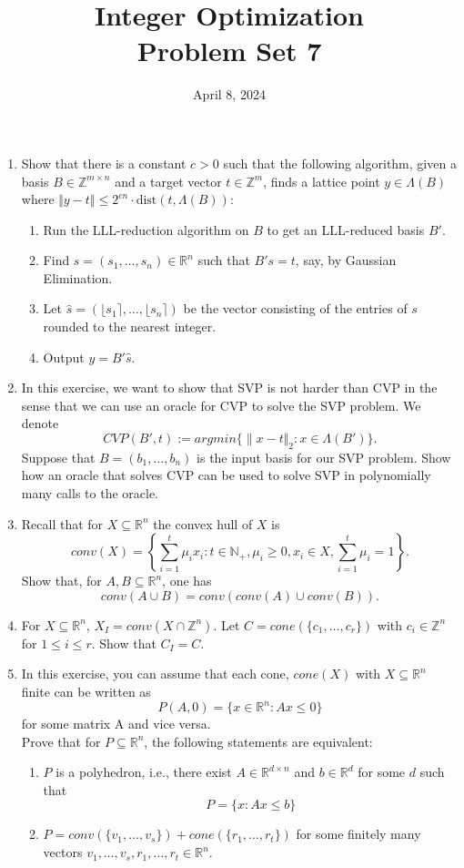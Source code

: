 \documentclass[11pt,a4paper]{article}
\title{Integer Optimization  \\ Problem Set 7 }
\date{ April 8, 2024}
\renewcommand{\leq}{\leqslant}
\renewcommand{\geq}{\geqslant}
\begin{document}
\maketitle 


\begin{enumerate}
\item Show that there is a constant $c > 0$ such that the following algorithm, given a basis $B ∈ \mathbb{Z}^{m×n}$ and a target
vector $t ∈ \mathbb{Z}^m$, finds a lattice point $y ∈ \Lambda(B)$ where
$\Vert y − t \Vert ≤ 2^{cn}  \cdot \text{dist}(t, \Lambda(B))$:
\begin{enumerate}
    \item Run the LLL-reduction algorithm on $B$ to get an LLL-reduced basis $B'$.
    \item Find $s = (s_1, \hdots , s_n) ∈\mathbb{R}^n$ such that $B's = t$, say, by Gaussian Elimination.
    \item Let $\hat{s} =  (⌊s_1⌉,\hdots,⌊s_n⌉)$ be the vector consisting of the entries of $s$ rounded to the nearest integer.
    \item Output $y = B'\hat{s}$.
\end{enumerate}


\item In this exercise, we want to show that SVP is not harder than CVP in the sense that we can use an oracle for CVP to solve the SVP problem. We denote $$CVP(B',t):=argmin\{∥x−t\Vert_2:x∈Λ(B')\}.$$ Suppose that $B = (b_1,\hdots,b_n)$ is the input basis for our SVP problem. Show how an oracle that solves CVP can be used to solve SVP in polynomially many calls to the oracle. 

\item Recall that for $X ⊆ \mathbb{R}^n$ the convex hull of $X$ is
 $$conv(X)= \left\{\sum_{i =1}^t μ_ix_i: t∈\mathbb{N}_+,μ_i\geq0,x_i∈X,\sum_{i =1}^t μ_i=1 \right\}.$$
Show that, for $A,B ⊆\mathbb{R}^n$, one has $$conv(A∪B)=conv(conv(A)∪conv(B)).$$

\item For $X⊆\mathbb{R}^n$, $X_I=conv(X∩\mathbb{Z}^n)$.
Let $C=cone(\{c_1,\hdots,c_r\})$ with $c_i ∈ \mathbb{Z}^n$ for $1\leq i\leq r$. Show that $C_I =C$.

\item In this exercise, you can assume that each cone, $cone(X)$ with $X ⊆ \mathbb{R}^n$ finite can be written as $$P(A,0)=\{x∈\mathbb{R}^n: Ax\leq 0\}$$ for some matrix A and vice versa. \\
Prove that for $P ⊆ \mathbb{R}^n$, the following statements are equivalent:
\begin{enumerate}
    \item $P$ is a polyhedron, i.e., there exist $A ∈ \mathbb{R}^{d×n}$ and $b ∈ \mathbb{R}^d$ for some $d$ such that
$$P =\{x:Ax\leq b\}$$
\item $P =conv(\{v_1,\hdots,v_s\})+cone(\{r_1,\hdots,r_t\})$ for some finitely many vectors $v_1, \hdots, v_s, r_1, \hdots, r_t \in \mathbb{R}^n$. 
\end{enumerate}


\end{enumerate}


%
%


 
\end{document}
